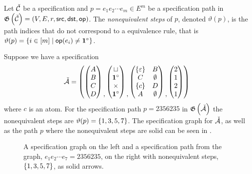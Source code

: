 \begin{definition}
Let $\check{\mathcal{C}}$ be a specification and $p=e_1e_2\dotsm e_m \in E^m$ be a specification path in $\mathfrak{G}\left(\check{\mathcal{C}}\right) = (V,E,r,\textsf{src}, \textsf{dst}, \textsf{op})$. The \emph{nonequivalent steps} of $p$, denoted $\vartheta(p)$, is the path indices that do not correspond to a equivalence rule, that is $\vartheta(p) = \left\{i\in[m] \mid \textsf{op}(e_i) \neq \mathbf{1}^\circ\right\}$.
\end{definition}
Suppose we have a specification  
\[
    \check{\mathcal{A}} = \left(\begin{pmatrix}A\\B\\C\\D\end{pmatrix}\begin{matrix}\\\\\\,\end{matrix} \begin{pmatrix}\sqcup\\ \mathbf{1}^\circ\\ \times\\ \mathbf{1}^\circ\end{pmatrix}\begin{matrix}\\\\\\,\end{matrix}\begin{pmatrix} \left\{\varepsilon\right\} & B \\ C & \emptyset \\ \left\{c\right\} & D \\ A & \emptyset\end{pmatrix}\begin{matrix}\\\\\\,\end{matrix}\begin{pmatrix}2\\1\\2\\1\end{pmatrix}\right)
\]
where $c$ is an atom. For the specification path $p = 2356235$ in $\mathfrak{G}\left(\check{\mathcal{A}}\right)$ the nonequivalent steps are $\vartheta(p) = \left\{1,3,5,7\right\}$. The specification graph for $\check{\mathcal{A}}$, as well as the path $p$ where the nonequivalent steps are solid can be seen in . 
\begin{figure}[ht!]
    \centering
    
    \caption{A specification graph on the left and a specification path from the graph, $e_1e_2\dotsm e_7=2356235$, on the right with nonequivalent steps, $\left\{1,3,5,7\right\}$, as solid arrows.}
    \label{fig:noneqsteps}
\end{figure}

